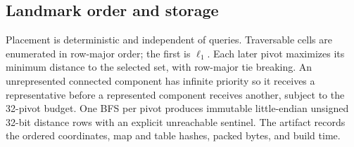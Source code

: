 \subsection{Landmark order and storage}

Placement is deterministic and independent of queries.  Traversable cells
are enumerated in row-major order; the first is $\ell_1$.  Each later pivot
maximizes its minimum distance to the selected set, with row-major tie
breaking.  An unrepresented connected component has infinite priority so it
receives a representative before a represented component receives another,
subject to the 32-pivot budget.  One BFS per pivot produces immutable
little-endian unsigned 32-bit distance rows with an explicit unreachable
sentinel.  The artifact records the ordered coordinates, map and table hashes,
packed bytes, and build time.
